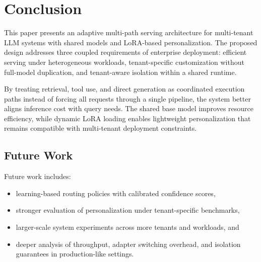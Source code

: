 \section{Conclusion}

This paper presents an adaptive multi-path serving architecture for multi-tenant LLM systems with shared models and LoRA-based personalization. The proposed design addresses three coupled requirements of enterprise deployment: efficient serving under heterogeneous workloads, tenant-specific customization without full-model duplication, and tenant-aware isolation within a shared runtime.

By treating retrieval, tool use, and direct generation as coordinated execution paths instead of forcing all requests through a single pipeline, the system better aligns inference cost with query needs. The shared base model improves resource efficiency, while dynamic LoRA loading enables lightweight personalization that remains compatible with multi-tenant deployment constraints.

\subsection{Future Work}

Future work includes:
\begin{itemize}
    \item learning-based routing policies with calibrated confidence scores,
    \item stronger evaluation of personalization under tenant-specific benchmarks,
    \item larger-scale system experiments across more tenants and workloads, and
    \item deeper analysis of throughput, adapter switching overhead, and isolation guarantees in production-like settings.
\end{itemize}
